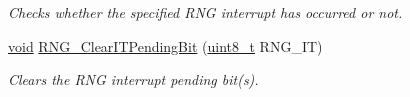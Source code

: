 \begin{DoxyCompactItemize}
\begin{DoxyCompactList}\small\item\em Checks whether the specified R\-N\-G interrupt has occurred or not. \end{DoxyCompactList}\item 
\hyperlink{group___n_a_m_e_ga18028b8badbf1ea7e704ccac3c488e82}{void} \hyperlink{group___r_n_g___group3_ga2b1c78c003cd5c886e09fdbc2c89cacb}{R\-N\-G\-\_\-\-Clear\-I\-T\-Pending\-Bit} (\hyperlink{stdint_8h_aba7bc1797add20fe3efdf37ced1182c5}{uint8\-\_\-t} R\-N\-G\-\_\-\-I\-T)
\begin{DoxyCompactList}\small\item\em Clears the R\-N\-G interrupt pending bit(s). \end{DoxyCompactList}\end{DoxyCompactItemize}


